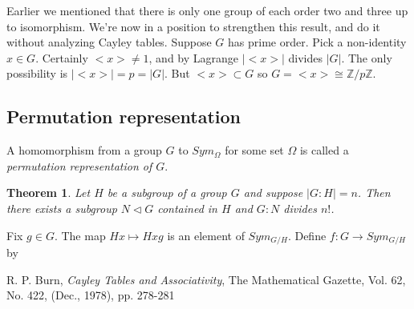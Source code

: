 \documentclass[letterpaper]{article}
\newtheorem{theorem}{Theorem}[section]
\newenvironment{proof}[1][Proof]{\begin{trivlist}
\item[\hskip \labelsep {\bfseries #1}]}{\end{trivlist}}
\begin{document}
Earlier we mentioned that there is only one group of each order two and three up to isomorphism. We're now in a position to strengthen this result, and do it without analyzing Cayley tables. Suppose $G$ has prime order. Pick a non-identity $x \in G$. Certainly ${<}x{>} \ne 1$, and by Lagrange $|{<}x{>}|$ divides $|G|$. The only possibility is $|{<}x{>}| = p = |G|$. But ${<}x{>} \subset G$ so $G = {<}x{>} \cong \mathbb{Z}/p\mathbb{Z}$.

\subsection{Permutation representation}

A homomorphism from a group $G$ to $Sym_\Omega$ for some set $\Omega$ is called a \emph{permutation representation of $G$}.

\begin{theorem}
Let $H$ be a subgroup of a group $G$ and suppose $|G\colon H| = n$. Then there exists a subgroup $N \lhd G$ contained in $H$ and $G\colon N$ divides $n!$.
\end{theorem}
\begin{proof}
Fix $g \in G$. The map $Hx \mapsto Hxg$ is an element of $Sym_{G/H}$. Define $f\colon G \rightarrow Sym_{G/H}$ by 
\end{proof}

\begin{thebibliography}{7}
 R. P. Burn, \emph{Cayley Tables and Associativity},
The Mathematical Gazette, Vol. 62, No. 422, (Dec., 1978), pp. 278-281
\end{thebibliography}
\end{document}
